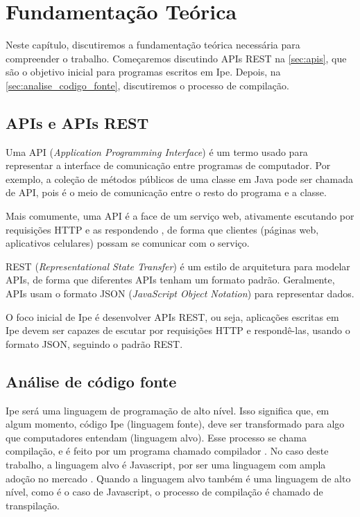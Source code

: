 
\chapter{Fundamentação Teórica}

Neste capítulo, discutiremos a fundamentação teórica necessária para compreender
o trabalho. Começaremos discutindo APIs REST na \autoref{sec:apis}, que são o
objetivo inicial para programas escritos em Ipe. Depois, na \autoref{sec:analise_codigo_fonte},
discutiremos o processo de compilação.

\section{APIs e APIs REST}\label{sec:apis}

Uma API (\textit{Application Programming Interface}) é um termo usado para representar
a interface de comunicação entre programas de computador. Por exemplo, a coleção
de métodos públicos de uma classe em Java pode ser chamada de API, pois é o
meio de comunicação entre o resto do programa e a classe.

Mais comumente, uma API é a face de um serviço web, ativamente escutando por
requisições HTTP e as respondendo \cite{restapirulebook}, de forma que clientes
(páginas web, aplicativos celulares) possam se comunicar com o serviço.

REST (\textit{Representational State Transfer}) é um estilo de arquitetura para
modelar APIs, de forma que diferentes APIs tenham um formato padrão. Geralmente,
APIs usam o formato JSON (\textit{JavaScript Object Notation}) para representar
dados.

O foco inicial de Ipe é desenvolver APIs REST, ou seja, aplicações escritas em  Ipe devem ser capazes
de escutar por requisições HTTP e respondê-las, usando o formato JSON, seguindo o padrão REST.

\section{Análise de código fonte}\label{sec:analise_codigo_fonte}

Ipe será uma linguagem de programação de alto nível. Isso significa que, em algum
momento, código Ipe (linguagem fonte), deve ser transformado para algo que
computadores entendam (linguagem alvo). Esse processo se chama compilação, e é
feito por um programa chamado compilador \cite{dragonbook}. No caso deste trabalho, a linguagem
alvo é Javascript, por ser uma linguagem com ampla adoção no mercado \cite{stackoverflowsurvey}.
Quando a linguagem alvo também é uma linguagem de alto nível, como é o caso de
Javascript, o processo de compilação é chamado de transpilação.

